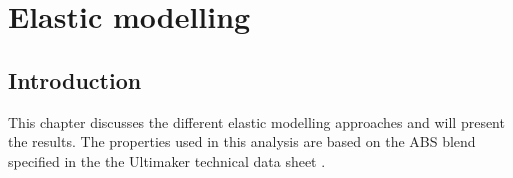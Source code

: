 \chapter{Elastic modelling}
\label{chp:6}
\graphicspath{{chapter_6_Elasticmodelling/figures/chapter_6.tex}}%

\section{Introduction}
This chapter discusses the different elastic modelling approaches and will present the results. The properties used in this analysis are based on the ABS blend specified in the the Ultimaker technical data sheet \cite{Ultimaker2018TechnicalABS}.



